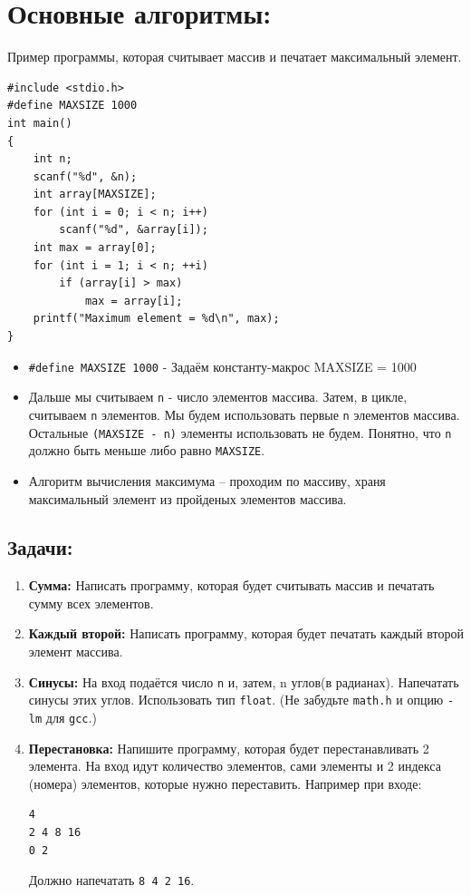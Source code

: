 \documentclass{article}
\begin{document}
\section*{Основные алгоритмы:}
Пример программы, которая считывает массив и печатает максимальный элемент.
\begin{lstlisting}
#include <stdio.h>
#define MAXSIZE 1000
int main() 
{
	int n;
	scanf("%d", &n);
	int array[MAXSIZE];
	for (int i = 0; i < n; i++)
		scanf("%d", &array[i]);
	int max = array[0];
	for (int i = 1; i < n; ++i)
		if (array[i] > max)
			max = array[i];
	printf("Maximum element = %d\n", max);
}
\end{lstlisting}
\begin{itemize}
\item \texttt{\#define MAXSIZE 1000} - Задаём константу-макрос MAXSIZE = 1000
\item Дальше мы считываем \texttt{n} - число элементов массива. Затем, в цикле, считываем \texttt{n} элементов.  Мы будем использовать первые \texttt{n} элементов массива. Остальные \texttt{(MAXSIZE - n)} элементы использовать не будем. Понятно, что \texttt{n} должно быть меньше либо равно \texttt{MAXSIZE}.
\item Алгоритм вычисления максимума -- проходим по массиву, храня максимальный элемент из пройденых элементов массива.
\end{itemize}

\subsection*{Задачи:}
\begin{enumerate}
\item \textbf{Сумма:} Написать программу, которая будет считывать массив и печатать сумму всех элементов.
\item \textbf{Каждый второй:} Написать программу, которая будет печатать каждый второй элемент массива.
\item \textbf{Синусы:} На вход подаётся число \texttt{n} и, затем, n углов(в радианах). Напечатать синусы этих углов. Использовать тип \texttt{float}. (Не забудьте \texttt{math.h} и опцию \texttt{-lm} для \texttt{gcc}.)
\item \textbf{Перестановка:} Напишите программу, которая будет перестанавливать 2 элемента. На вход идут количество элементов, сами элементы и 2 индекса (номера) элементов, которые нужно переставить. Например при входе:
\begin{verbatim}
4
2 4 8 16
0 2
\end{verbatim}
Должно напечатать \texttt{8 4 2 16}.
\end{enumerate}
\end{document}
